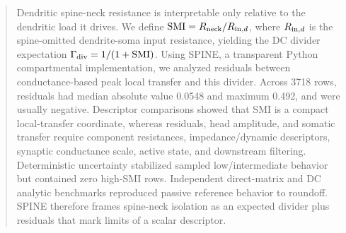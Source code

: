 \begin{abstract}
Dendritic spine-neck resistance is interpretable only relative to the dendritic load it drives. We define $\SMI=\Rneck/\Rin$, where $\Rin$ is the spine-omitted dendrite-soma input resistance, yielding the DC divider expectation $\Gamma_{\mathrm{div}}=1/(1+\SMI)$. Using SPINE, a transparent Python compartmental implementation, we analyzed residuals between conductance-based peak local transfer and this divider. Across 3718 rows, residuals had median absolute value 0.0548 and maximum 0.492, and were usually negative. Descriptor comparisons showed that SMI is a compact local-transfer coordinate, whereas residuals, head amplitude, and somatic transfer require component resistances, impedance/dynamic descriptors, synaptic conductance scale, active state, and downstream filtering. Deterministic uncertainty stabilized sampled low/intermediate behavior but contained zero high-SMI rows. Independent direct-matrix and DC analytic benchmarks reproduced passive reference behavior to roundoff. SPINE therefore frames spine-neck isolation as an expected divider plus residuals that mark limits of a scalar descriptor.
\end{abstract}
